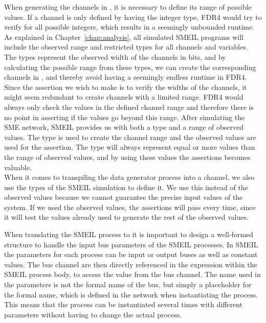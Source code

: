When generating the channels in \cspm{}, it is necessary to define its range of possible values. If a channel is only defined by having the integer type, FDR4 would try to verify for all possible integers, which results in a seemingly unbounded runtime. As explained in Chapter~\ref{chap:analysis}, all simulated SMEIL programs will include the observed range and restricted types for all channels and variables. The types represent the observed width of the channels in bits, and by calculating the possible range from these types, we can create the corresponding channels in \cspm{}, and thereby avoid having a seemingly endless runtime in FDR4.\\

Since the assertion we wish to make is to verify the widths of the channels, it might seem redundant to create \cspm{} channels with a limited range. FDR4 would always only check the values in the defined channel range and therefore there is no point in asserting if the values go beyond this range. After simulating the SME network, SMEIL provides us with both a type and a range of observed values. The type is used to create the \cspm{} channel range and the observed values are used for the assertion. The type will always represent equal or more values than the range of observed values, and by using these values the assertions becomes valuable.
\\

When it comes to transpiling the data generator process into a \cspm{} channel, we also use the types of the SMEIL simulation to define it. We use this instead of the observed values because we cannot guarantee the precise input values of the system. If we used the observed values, the assertions will pass every time, since it will test the values already used to generate the rest of the observed values.

%



When translating the SMEIL process to \cspm{} it is important to design a well-formed structure to handle the input bus parameters of the SMEIL processes.
In SMEIL the parameters for each process can be input or output buses as well as constant values. The bus channel are then directly referenced in the expression within the SMEIL process body, to access the value from the bus channel. The name used in the parameters is not the formal name of the bus, but simply a placeholder for the formal name, which is defined in the network when instantiating the process. This means that the process can be instantiated several times with different parameters without having to change the actual process. \\

